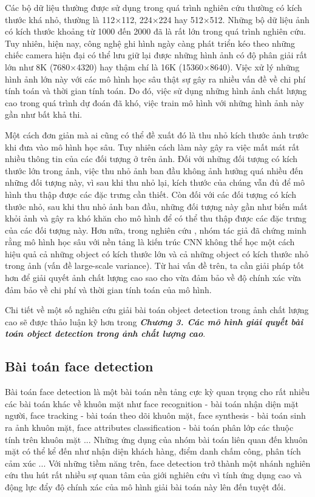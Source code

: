 {    \noindent
    Các bộ dữ liệu thường được sử dụng trong quá trình nghiên cứu thường có kích thước khá nhỏ, thường là 112×112, 224×224 hay 512×512.
    Những bộ dữ liệu ảnh có kích thước khoảng từ 1000 đến 2000 đã là rất lớn trong quá trình nghiên cứu.
    Tuy nhiên, hiện nay, công nghệ ghi hình ngày càng phát triển kéo theo những chiếc camera hiện đại có thể lưu giữ lại được những hình ảnh có độ phân giải rất lớn như 8K (7680×4320) hay thậm chí là 16K (15360×8640).
    Việc xử lý những hình ảnh lớn này với các mô hình học sâu thật sự gây ra nhiều vấn đề về chi phí tính toán và thời gian tính toán.
    Do đó, việc sử dụng những hình ảnh chất lượng cao trong quá trình dự đoán đã khó, việc train mô hình với những hình ảnh này gần như bất khả thi.

    \noindent
    Một cách đơn giản mà ai cũng có thể đề xuất đó là thu nhỏ kích thước ảnh trước khi đưa vào mô hình học sâu.
    Tuy nhiên cách làm này gây ra việc mất mát rất nhiều thông tin của các đối tượng ở trên ảnh.
    Đối với những đối tượng có kích thước lớn trong ảnh, việc thu nhỏ ảnh ban đầu không ảnh hưởng quá nhiều đến những đối tượng này, vì sau khi thu nhỏ lại, kích thước của chúng vẫn đủ để mô hình thu thập được các đặc trưng cần thiết.
    Còn đối với các đối tượng có kích thước nhỏ, sau khi thu nhỏ ảnh ban đầu, những đối tượng này gần như biến mất khỏi ảnh và gây ra khó khăn cho mô hình để có thể thu thập được các đặc trưng của các đối tượng này.
    Hơn nữa, trong nghiên cứu \cite{singh2018analysis}, nhóm tác giả đã chứng minh rằng mô hình học sâu với nền tảng là kiến trúc CNN không thể học một cách hiệu quả cả những object có kích thước lớn và cả những object có kích thước nhỏ trong ảnh (vấn đề large-scale variance).
    Từ hai vấn đề trên, ta cần giải pháp tốt hơn để giải quyết ảnh chất lượng cao sao cho vừa đảm bảo về độ chính xác vừa đảm bảo về chi phí và thời gian tính toán của mô hình.

    \noindent
    Chi tiết về một số nghiên cứu giải bài toán object detection trong ảnh chất lượng cao sẽ được thảo luận kỹ hơn trong \textbf{\textit{Chương 3. Các mô hình giải quyết bài toán object detection trong ảnh chất lượng cao}}.

    \subsection{Bài toán face detection}
    Bài toán face detection là một bài toán nền tảng cực kỳ quan trọng cho rất nhiều các bài toán khác về khuôn mặt như face recognition - bài toán nhận diện mặt người, face tracking - bài toán theo dõi khuôn mặt, face synthesis - bài toán sinh ra ảnh khuôn mặt, face attributes classification - bài toán phân lớp các thuộc tính trên khuôn mặt ...
    Những ứng dụng của nhóm bài toán liên quan đến khuôn mặt có thể kể đến như nhận diện khách hàng, điểm danh chấm công, phân tích cảm xúc ...
    Với những tiềm năng trên, face detection trở thành một nhánh nghiên cứu thu hút rất nhiều sự quan tâm của giới nghiên cứu vì tính ứng dụng cao và động lực đẩy độ chính xác của mô hình giải bài toán này lên đến tuyệt đối.
    
}
